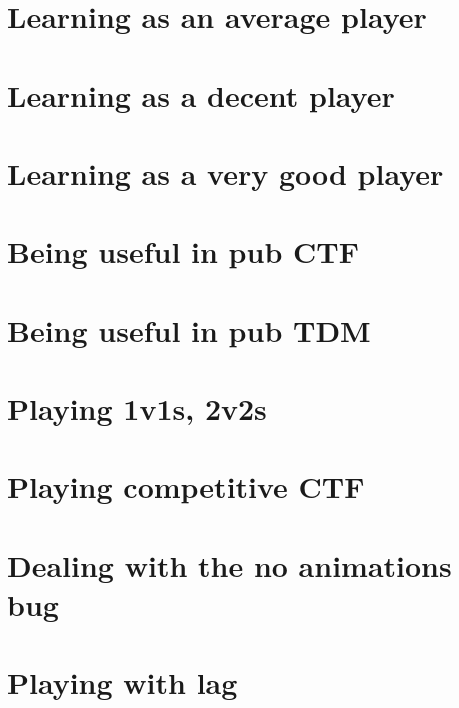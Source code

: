 \documentclass[]{book}
\begin{document}
\chapter{Learning as an average
player}\label{learning-as-an-average-player}

\chapter{Learning as a decent player}\label{learning-as-a-decent-player}

\chapter{Learning as a very good
player}\label{learning-as-a-very-good-player}

\chapter{Being useful in pub CTF}\label{being-useful-in-pub-ctf}

\chapter{Being useful in pub TDM}\label{being-useful-in-pub-tdm}

\chapter{Playing 1v1s, 2v2s}\label{playing-1v1s-2v2s}

\chapter{Playing competitive CTF}\label{playing-competitive-ctf}

\chapter{Dealing with the no animations
bug}\label{dealing-with-the-no-animations-bug}

\chapter{Playing with lag}\label{playing-with-lag}


\end{document}
